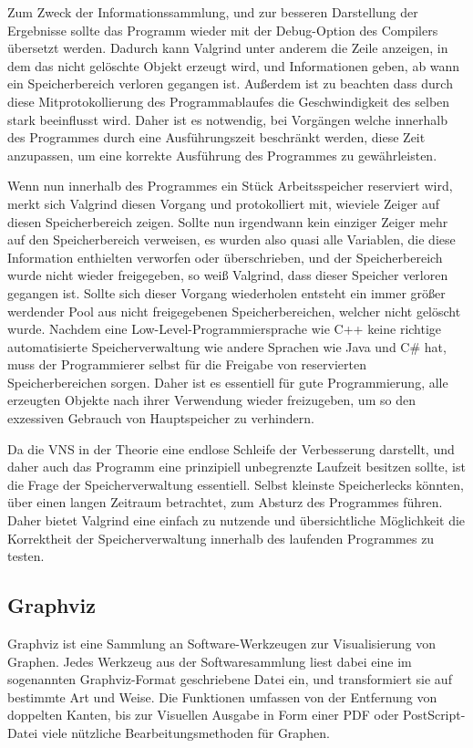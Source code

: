 Zum Zweck der Informationssammlung, und zur besseren Darstellung der Ergebnisse sollte das Programm wieder mit der Debug-Option des Compilers übersetzt werden. Dadurch kann Valgrind unter anderem die Zeile
anzeigen, in dem das nicht gelöschte Objekt erzeugt wird, und Informationen geben, ab wann ein Speicherbereich verloren gegangen ist. Außerdem ist zu beachten dass durch diese Mitprotokollierung des 
Programmablaufes die Geschwindigkeit des selben stark beeinflusst wird. Daher ist es notwendig, bei Vorgängen welche innerhalb des Programmes durch eine Ausführungszeit beschränkt werden, diese Zeit anzupassen, 
um eine korrekte Ausführung des Programmes zu gewährleisten. 

Wenn nun innerhalb des Programmes ein Stück Arbeitsspeicher reserviert wird, merkt sich Valgrind diesen Vorgang und protokolliert mit, wieviele Zeiger auf diesen Speicherbereich zeigen. Sollte nun irgendwann
kein einziger Zeiger mehr auf den Speicherbereich verweisen, es wurden also quasi alle Variablen, die diese Information enthielten verworfen oder überschrieben, und der Speicherbereich wurde nicht wieder
freigegeben, so weiß Valgrind, dass dieser Speicher verloren gegangen ist. Sollte sich dieser Vorgang wiederholen entsteht ein immer größer werdender Pool aus nicht freigegebenen Speicherbereichen, welcher
nicht gelöscht wurde. Nachdem eine Low-Level-Programmiersprache wie C++ keine richtige automatisierte Speicherverwaltung wie andere Sprachen wie Java und C\# hat, muss der Programmierer selbst für die 
Freigabe von reservierten Speicherbereichen sorgen. Daher ist es essentiell für gute Programmierung, alle erzeugten Objekte nach ihrer Verwendung wieder freizugeben, um so den exzessiven Gebrauch von
Hauptspeicher zu verhindern.

Da die VNS in der Theorie eine endlose Schleife der Verbesserung darstellt, und daher auch das Programm eine prinzipiell unbegrenzte Laufzeit besitzen sollte, ist die Frage der Speicherverwaltung essentiell.
Selbst kleinste Speicherlecks könnten, über einen langen Zeitraum betrachtet, zum Absturz des Programmes führen. Daher bietet Valgrind eine einfach zu nutzende und übersichtliche Möglichkeit die Korrektheit
der Speicherverwaltung innerhalb des laufenden Programmes zu testen. 

\subsection{Graphviz}
Graphviz ist eine Sammlung an Software-Werkzeugen zur Visualisierung von Graphen. Jedes Werkzeug aus der Softwaresammlung liest dabei eine im sogenannten Graphviz-Format ge\-schriebene Datei ein, und transformiert
sie auf bestimmte Art und Weise. Die Funktionen umfassen von der Entfernung von doppelten Kanten, bis zur Visuellen Ausgabe in Form einer PDF oder PostScript-Datei viele nützliche Bearbeitungsmethoden für 
Graphen. 

